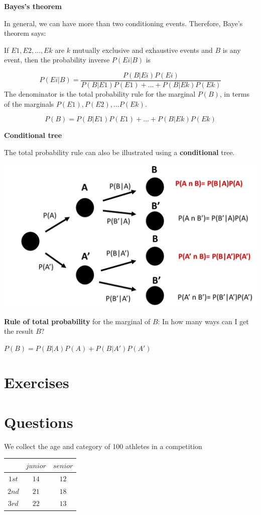 \documentclass[
]{book}
\begin{document}
\textbf{Bayes's theorem}

In general, we can have more than two conditioning events. Therefore, Baye's theorem says:

If \(E1, E2, ..., Ek\) are \(k\) mutually exclusive and exhaustive events and \(B\) is any event, then the probability inverse \(P(Ei| B)\) is

\[P(Ei| B)= \frac{P(B|Ei)P(Ei)}{P(B|E1)P(E1) +...+ P(B|Ek)P(Ek)}\]
The denominator is the total probability rule for the marginal \(P(B)\), in terms of the marginals \(P(E1), P(E2), ... P(Ek)\).

\[P(B)=P(B|E 1)P (E1) +...+ P(B|Ek)P(Ek)\]

\textbf{Conditional tree}

The total probability rule can also be illustrated using a \textbf{conditional} tree.

\includegraphics{./figures/treetot.PNG}

\textbf{Rule of total probability} for the marginal of \(B\): In how many ways can I get the result \(B\)?

\(P(B)=P(B|A)P(A)+P(B|A')P(A')\)

\hypertarget{exercises-2}{%
\section{Exercises}\label{exercises-2}}

\hypertarget{questions-2}{%
\section{Questions}\label{questions-2}}

We collect the age and category of 100 athletes in a competition

\begin{longtable}[]{@{}ccc@{}}
\toprule
& \(junior\) & \(senior\) \\
\midrule
\endhead
\(1st\) & \(14\) & \(12\) \\
\(2nd\) & \(21\) & \(18\) \\
\(3rd\) & \(22\) & \(13\) \\
\bottomrule
\end{longtable}
\end{document}
